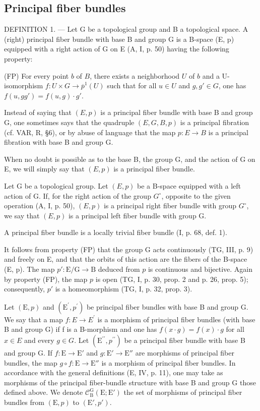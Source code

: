 \subsection{Principal fiber bundles}

DEFINITION 1. --- Let G be a topological group and B a topological space. A (right) principal fiber bundle with base B and group G is a B-space (E, p) equipped with a right action of G on E (A, I, p. 50) having the following property:

(FP) For every point \(b\) of \(B\), there exists a neighborhood \(U\) of \(b\) and a U-isomorphism \(f\colon U\times G\to \overline{p}^{1}(U)\) such that for all \(u\in U\) and \(g,g'\in G\), one has \(f(u,gg')=f(u,g)\cdot g'\).

Instead of saying that \((E, p)\) is a principal fiber bundle with base B and group G, one sometimes says that the quadruple \((E, G, B, p)\) is a principal fibration (cf. VAR, R, §6), or by abuse of language that the map \(p: E \to B\) is a principal fibration with base B and group G.

When no doubt is possible as to the base B, the group G, and the action of G on E, we will simply say that \((E, p)\) is a principal fiber bundle.

Let G be a topological group. Let \((E,p)\) be a B-space equipped with a left action of G. If, for the right action of the group \(G^{\circ}\), opposite to the given operation (A, I, p. 50), \((E,p)\) is a principal right fiber bundle with group \(G^{\circ}\), we say that \((E,p)\) is a principal left fiber bundle with group G.

A principal fiber bundle is a locally trivial fiber bundle (I, p. 68, def. 1).

It follows from property (FP) that the group G acts continuously (TG, III, p. 9) and freely on E, and that the orbits of this action are the fibers of the B-space (E, p). The map \(p' \colon \mathrm{E} / \mathrm{G} \to \mathrm{B}\) deduced from \(p\) is continuous and bijective. Again by property (FP), the map \(p\) is open (TG, I, p. 30, prop. 2 and p. 26, prop. 5); consequently, \(p'\) is a homeomorphism (TG, I, p. 32, prop. 3).

Let \((\mathrm{E},p)\) and \((\mathrm{E}^{\prime},p^{\prime})\) be principal fiber bundles with base B and group G. We say that a map \(f: E \to E^{\prime}\) is a morphism of principal fiber bundles (with base B and group G) if f is a B-morphism and one has \(f(x \cdot g) = f(x) \cdot g\) for all \(x \in E\) and every \(g \in G\). Let \((\mathrm{E}^{\prime\prime},p^{\prime\prime})\) be a principal fiber bundle with base B and group G. If \(f: \mathrm{E} \to \mathrm{E}'\) and \(g: \mathrm{E}' \to \mathrm{E}''\) are morphisms of principal fiber bundles, the map \(g \circ f: \mathrm{E} \to \mathrm{E}''\) is a morphism of principal fiber bundles. In accordance with the general definitions (E, IV, p. 11), one may take as morphisms of the principal fiber-bundle structure with base B and group G those defined above. We denote \(\mathcal{C}_{\mathrm{B}}^{\mathrm{G}}(\mathrm{E}; \mathrm{E}')\) the set of morphisms of principal fiber bundles from \((\mathrm{E}, p)\) to \((\mathrm{E}',p')\).

